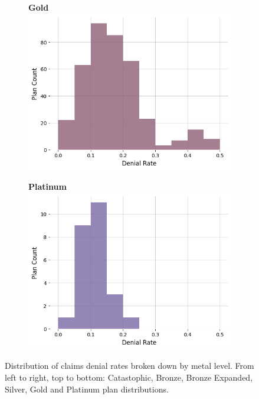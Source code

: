 \documentclass[12pt, a4paper,twoside,parskip=full]{report}
\theoremstyle{plain} %
\theoremstyle{definition} %
\theoremstyle{remark} %
\numberwithin{equation}{chapter}
\begin{document}
\begin{figure}
				\begin{subfigure}[t]{0.49\textwidth}
					\centering
					\textbf{Gold}
					\includegraphics[width=\textwidth]{images/cms_puf/Gold_dist.png}
				\end{subfigure}
				\hfill
				\begin{subfigure}[t]{0.49\textwidth}
					\centering
					\textbf{Platinum}
					\includegraphics[width=\textwidth]{images/cms_puf/Platinum_dist.png}
				\end{subfigure}

				
				\caption{Distribution of claims denial rates broken down by metal level. From left to right, top to bottom: Catastophic, Bronze, Bronze Expanded, Silver, Gold and Platinum plan distributions.}
				\label{federaldenialratesbymetallevel}
			\end{figure}
		
\end{document}
